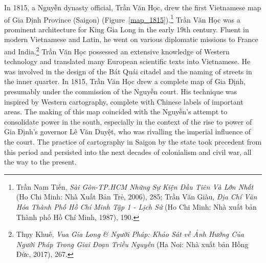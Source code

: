 In 1815, a Nguyễn dynasty official, Trần Văn Học, drew the first Vietnamese map of Gia Định Province (Saigon) (Figure~\ref{map_1815}).\footnote{Trần Nam Tiến, \textit{Sài Gòn-TP.HCM Những Sự Kiện Đầu Tiên Và Lớn Nhất} (Ho Chi Minh: Nhà Xuất Bản Trẻ, 2006), 285; Trần Văn Giàu, \textit{Địa Chí Văn Hóa Thành Phố Hồ Chí Minh Tập 1 - Lịch Sử} (Ho Chi Minh: Nhà xuất bản Thành phố Hồ Chí Minh, 1987), 190.}  Trần Văn Học was a prominent architecture for King Gia Long in the early 19th century. Fluent in modern Vietnamese and Latin, he went on various diplomatic missions to France and India.\footnote{\vi Thụy Khuê, \textit{Vua Gia Long \& Người Pháp: Khảo Sát về Ảnh Hưởng Của Người Pháp Trong Giai Đoạn Triều Nguyễn} (Ha Noi: Nhà xuất bản Hồng Đức, 2017), 267.} Trần Văn Học possessed an extensive knowledge of Western technology and translated many European scientific texts into Vietnamese. He was involved in the design of the Bát Quái citadel and the naming of streets in the inner quarter. In 1815, Trần Văn Học drew a complete map of Gia Định, presumably under the commission of the Nguyễn court. His technique was inspired by Western cartography, complete with Chinese labels of important areas. The making of this map coincided with the Nguyễn’s attempt to consolidate power in the south, especially in the context of the rise to power of Gia Định’s governor Lê Văn Duyệt, who was rivalling the imperial influence of the court. The practice of cartography in Saigon by the state took precedent from this period and persisted into the next decades of colonialism and civil war, all the way to the present.

